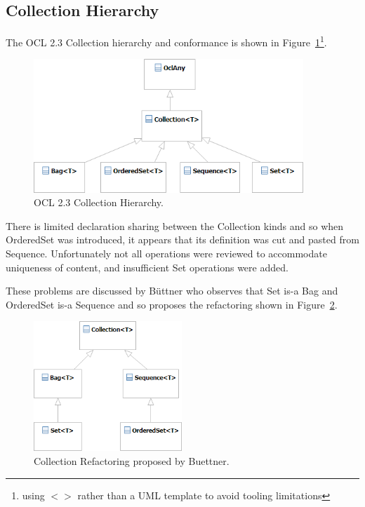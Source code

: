 \documentclass{eceasst}
\begin{document}
\subsection{Collection Hierarchy}

The OCL 2.3 Collection hierarchy and conformance is shown in Figure~\ref{fig:Collections_2_2}\footnote{using $< >$ rather than a UML template to avoid tooling limitations}.

\begin{figure}
  \begin{center}
    \includegraphics[width=4.0in]{Collections_2_2.png}
  \end{center}
  \caption{OCL 2.3 Collection Hierarchy.}
  \label{fig:Collections_2_2}
\end{figure}

There is limited declaration sharing between the Collection kinds and so when OrderedSet was introduced, it appears that its definition was cut and pasted from Sequence. Unfortunately not all operations were reviewed to accommodate uniqueness of content, and insufficient Set operations were added. 

These problems are discussed by B\"{u}ttner\cite{Buttner} who observes that Set is-a Bag and OrderedSet is-a Sequence and so proposes the refactoring shown in Figure~\ref{fig:Collections_Buettner}.

\begin{figure}
  \begin{center}
    \includegraphics[width=2.2in]{Collections_Buettner.png}
  \end{center}
  \caption{Collection Refactoring proposed by Buettner.}
  \label{fig:Collections_Buettner}
\end{figure}
\end{document}
